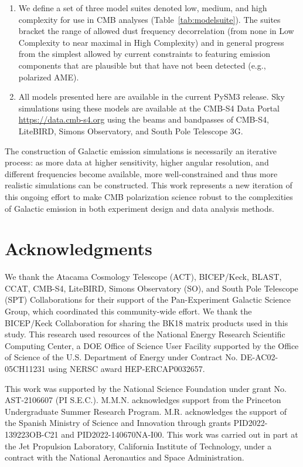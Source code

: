 \documentclass[twocolumn]{aastex631}
\begin{document}
\begin{enumerate}
    \item We define a set of three model suites denoted low, medium, and high complexity for use in CMB analyses (Table~\ref{tab:modelsuite}). The suites bracket the range of allowed dust frequency decorrelation (from none in Low Complexity to near maximal in High Complexity) and in general progress from the simplest allowed by current constraints to featuring emission components that are plausible but that have not been detected (e.g., polarized AME). 
    \item All models presented here are available in the current PySM3 release. Sky simulations using these models are available at the CMB-S4 Data Portal \url{https://data.cmb-s4.org} using the beams and bandpasses of CMB-S4, LiteBIRD, Simons Observatory, and South Pole Telescope 3G.
\end{enumerate}

The construction of Galactic emission simulations is necessarily an iterative process: as more data at higher sensitivity, higher angular resolution, and different frequencies become available, more well-constrained and thus more realistic simulations can be constructed. This work represents a new iteration of this ongoing effort to make CMB polarization science robust to the complexities of Galactic emission in both experiment design and data analysis methods. %

\section*{Acknowledgments}
We thank the Atacama Cosmology Telescope (ACT), BICEP/Keck, BLAST, CCAT, CMB-S4, LiteBIRD, Simons Observatory (SO), and South Pole Telescope (SPT) Collaborations for their support of the Pan-Experiment Galactic Science Group, which coordinated this community-wide effort. We thank the BICEP/Keck Collaboration for sharing the BK18 matrix products used in this study. This research used resources of the National Energy Research Scientific Computing Center, a DOE Office of Science User Facility supported by the Office of Science of the U.S. Department of Energy under Contract No. DE-AC02-05CH11231 using NERSC award HEP-ERCAP0032657. 

This work was supported by the National Science Foundation under grant No. AST-2106607 (PI S.E.C.). M.M.N. acknowledges support from the Princeton Undergraduate Summer Research Program. M.R. acknowledges the support of the Spanish Ministry of Science and Innovation through grants PID2022-139223OB-C21 and PID2022-140670NA-I00. This work was carried out in part at the Jet Propulsion Laboratory, California Institute of Technology, under a contract with the National Aeronautics and Space Administration.



\end{document}
